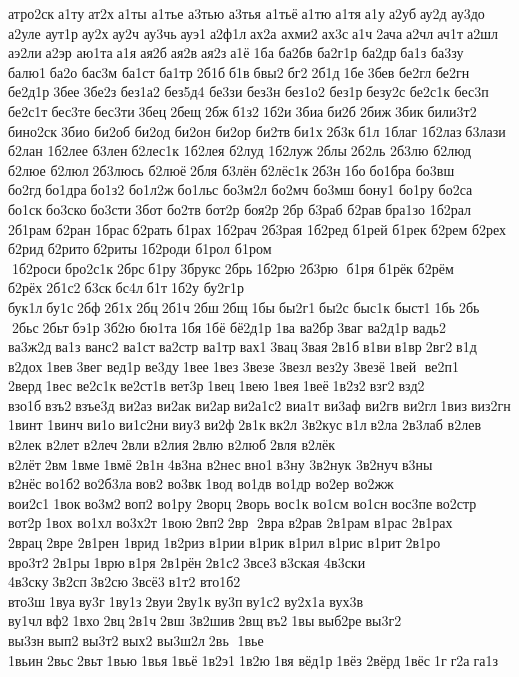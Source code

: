 атро2ск а1ту ат2х а1ты 	а1тье 	а3тью 	а3тья 	а1тьё а1тю а1тя а1у а2уб ау2д 	ау3до 	а2уле 	аут1р ау2х ау2ч 	ау3чь ауэ1 а2ф1л ах2а 	ахми2 ах3с а1ч 2ача а2чл ач1т а2шл 	аэ2ли а2эр 	аю1та а1я ая2б ая2в ая2з а1ё 1ба 	ба2бв 
ба2г1р 	ба2др ба1з 	ба3зу 	балю1 ба2о 	бас3м 	ба1ст 	ба1тр 2б1б б1в бвы2 бг2 2б1д 1бе 3бев 	бе2гл 	бе2гн 
бе2д1р 3бее 3бе2з 
без1а2 
без5д4 	бе3зи 	без3н 
без1о2 	без1р безу2с 
бе2с1к 	бес3п 
бе2с1т бес3те бес3ти 3бец 2бещ 2бж б1з2 1б2и 3биа би2б 2биж 3бик били3т2 
бино2ск 3био 	би2об 	би2од 	би2он 	би2ор 	би2тв би1х 2б3к б1л 	1благ 
1б2лаз б3лази 	б2лан 
1б2лее 	б3лен б2лес1к 
1б2лея 	б2луд 
1б2луж 2блы 2б2ль 	2б3лю  	б2люд 	б2люе 	б2люл 2б3люсь 	б2люё 2бля 	б3лён б2лёс1к 2б3н 1бо бо1бра 	бо3вш 	бо2гд бо1дра бо1з2 
бо1л2ж бо1льс 
бо3м2л 	бо2мч 	бо3мш 	бону1 	бо1ру 	бо2са 	бо1ск бо3ско бо3сти 3бот 	бо2тв 	бот2р 	боя2р 2бр  	б3раб 	б2рав бра1зо 
1б2рал 
2б1рам 	б2ран 	1брас б2рать 	б1рах 
1б2рач 
2б3рая 
1б2ред 	б1рей 	б1рек 	б2рем 	б2рех 	б2рид б2рито б2риты 1б2роди 	б1рол 
б1ром  1б2роси бро2с1к 2брс б1ру 3брукс 2брь 1б2рю 	2б3рю  б1ря 	б1рёк 	б2рём 	б2рёх 2б1с2 б3ск бс4л б1т 1б2у 
бу2г1р 	бук1л бу1с 2бф 2б1х 2бц 2б1ч 2бш 2бщ 1бы бы2г1 бы2с 	быс1к 	быст1 1бь 2бь  2бьс 2бьт бэ1р 3б2ю 	бю1та 1бя 1бё 
бё2д1р 1ва 	ва2бр 3ваг 
ва2д1р 	вадь2 
ва3ж2д ва1з 	ванс2 	ва1ст ва2стр 	ва1тр вах1 3вац 3вая 2в1б в1ви в1вр 2вг2 в1д 	в2дох 1вев 3вег 	вед1р 	ве3ду 1вее 1вез 	3везе 	3везл 	вез2у 	3везё 1вей  ве2п1 	2верд 1вес 
ве2с1к ве2ст1в 	вет3р 1вец 1вею 1вея 1веё 1в2з2 взг2 взд2 	взо1б взъ2 взъе3д 	ви2аз 	ви2ак 	ви2ар ви2а1с2 	виа1т 	ви3аф 	ви2гв 	ви2гл 1виз виз2гн 	1винт 	1винч ви1о ви1с2ни виу3 ви2ф 2в1к вк2л 
3в2кус в1л в2ла 
2в3лаб 	в2лев 	в2лек 	в2лет 	в2леч 2вли 	в2лия 2влю 	в2люб 2вля 	в2лёк 	в2лёт 2вм 1вме 1вмё 2в1н 4в3на 	в2нес вно1 в3ну  
3в2нук 
3в2нуч в3ны 	в2нёс во1б2 во2б3ла вов2 	во3вк 1вод 	во1дв 	во1др 	во2ер 	во2жж 
вои2с1 1вок во3м2 воп2 	во1ру 	2ворц 	2ворь 	вос1к 	во1см 	во1сн вос3пе во2стр 	вот2р 1вох 	во1хл 
во3х2т 1вою 2вп2 2вр  2вра  	в2рав 
2в1рам 	в1рас 
2в1рах 	2врац 2вре  
2в1рен 	1врид 
1в2риз 	в1рии 	в1рик 	в1рил 	в1рис 	в1рит 2в1ро 
вро3т2 2в1ры 1врю в1ря 
2в1рён 2в1с2 3все3 в3ская 
4в3ски 
4в3ску 3в2сп 3в2сю 3всё3 в1т2 
вто1б2 	вто3ш 1вуа ву3г 1ву1з 2вуи 2ву1к ву3п ву1с2 
ву2х1а 	вух3в 	ву1чл вф2 1вхо 2вц 2в1ч 2вш 
3в2шив 2вщ въ2 1вы выб2ре вы3г2 	вы3зн вып2 вы3т2 вых2 
вы3ш2л 2вь  1вье 	1вьин 2вьс 2вьт 1вью 1вья 1вьё 1в2э1 1в2ю 1вя 	вёд1р 1вёз 	2вёрд 1вёс 1г г2а га1з 
